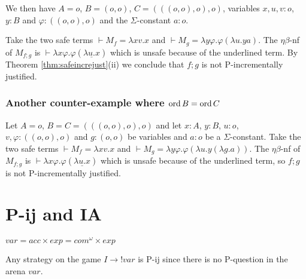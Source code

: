 We then have $A=o$, $B=(o,o)$, $C=(((o,o),o),o)$, variables
$x,u,v:o$, $y:B$ and $\varphi:((o,o),o)$ and the $\Sigma$-constant $a:o$.

Take the two safe terms $\vdash  M_f = \lambda xv.x$ and  $\vdash M_g = \lambda y \varphi. \varphi (\lambda u . y a)$.
The $\eta\beta$-nf of $M_{f;g}$ is $\vdash \lambda x \varphi. \varphi (\underline{\lambda u . x})$ which is unsafe because of the underlined term. By
Theorem \ref{thm:safeincrejust}(ii) we conclude that $f;g$ is not P-incrementally justified.



\subsubsection{Another counter-example where $\mathop{\mathrm{ord}}{B} = \mathop{\mathrm{ord}}{C}$}

Let $A=o$, $B=C=(((o,o),o),o)$ and let $x:A$, $y:B$, $u:o$, $v,\varphi:((o,o),o)$
and $g:(o,o)$ be variables and  $a:o$ be a $\Sigma$-constant. Take the two safe terms $\vdash  M_f = \lambda x v.x$ and $\vdash M_g = \lambda y \varphi. \varphi (\lambda u . y (\lambda g. a))$.
The $\eta\beta$-nf of $M_{f;g}$ is $\vdash \lambda x \varphi. \varphi (\underline{\lambda u . x})$ which is unsafe because of the underlined term, so
$f;g$ is not P-incrementally justified.
 




\section{P-ij and IA}
$var = acc \times exp = com^{\omega}\times exp$

Any strategy on the game $I \rightarrow !var$ is P-ij since there is no P-question in the arena $var$.



